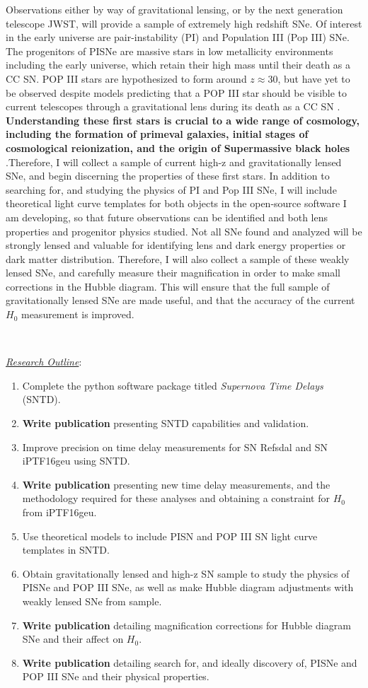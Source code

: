 Observations either by way of gravitational lensing, or by the next
generation telescope JWST, will provide a sample of extremely high
redshift SNe. Of interest in the early universe are pair-instability
(PI) and Population III (Pop III) SNe. The progenitors of PISNe are
massive stars in low metallicity environments including the early
universe, which retain their high mass until their death as a CC
SN. POP III stars are hypothesized to form around $z\approx30$, but
have yet to be observed despite models predicting that a POP III star
should be visible to current telescopes through a gravitational lens
during its death as a CC SN \citep{marri:1998}. \textbf{Understanding these
first stars is crucial to a wide range of cosmology, including the
formation of primeval galaxies, initial stages of cosmological
reionization, and the origin of Supermassive black
holes} \citep{Whalen:2013}.Therefore, I will collect a sample of
current high-z and gravitationally lensed SNe, and begin discerning
the properties of these first stars. In addition to searching for, and
studying the physics of PI and Pop III SNe, I will include theoretical
light curve templates for both objects in the open-source software I
am developing, so that future observations can be identified and both
lens properties and progenitor physics studied. Not all SNe found and
analyzed will be strongly lensed and valuable for identifying lens and
dark energy properties or dark matter distribution. Therefore, I will
also collect a sample of these weakly lensed SNe, and carefully
measure their magnification in order to make small corrections in the
Hubble diagram. This will ensure that the full sample of
gravitationally lensed SNe are made useful, and that the accuracy of
the current $H_0$ measurement is improved.

\

\noindent\underline{\textit{Research Outline}}:
\begin{enumerate}
\item
Complete the python software package titled \textit{Supernova Time Delays} (SNTD).
\item
\textbf{Write publication} presenting SNTD capabilities and validation.
\item
Improve precision on time delay measurements for SN Refsdal and SN iPTF16geu using SNTD.
\item
\textbf{Write publication} presenting new time delay measurements, and the methodology required for these analyses and obtaining a constraint for $H_0$ from iPTF16geu.
\item
Use theoretical models to include PISN and POP III SN light curve templates in SNTD.
\item
Obtain gravitationally lensed and high-z SN sample to study the physics of PISNe and POP III SNe, as well as make Hubble diagram adjustments with weakly lensed SNe from sample.
\item
\textbf{Write publication} detailing magnification corrections for Hubble diagram SNe and their affect on $H_0$.
\item
\textbf{Write publication} detailing search for, and ideally discovery of, PISNe and POP III SNe and their physical properties.
\end{enumerate}

